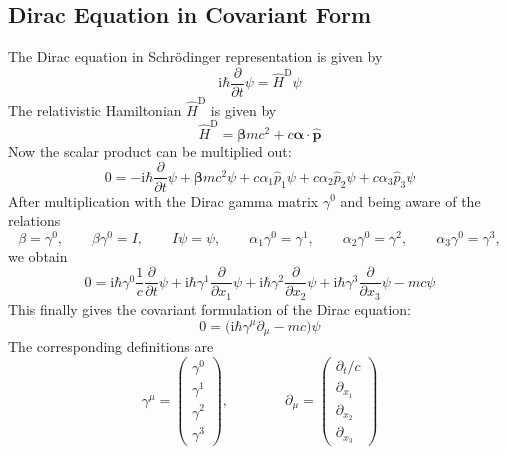 \documentclass[9pt]{report}
\begin{document}
\subsection{Dirac Equation in Covariant Form}
The Dirac equation in Schrödinger representation is given by
\begin{equation}
\mathrm{i}\hbar\frac{\partial}{\partial t}\psi = \hat{H}^{\mathrm{D}}\psi
\end{equation}
The relativistic Hamiltonian $\hat{H}^{\mathrm{D}}$ is given by
\begin{equation}
\hat{H}^{\mathrm{D}}=\boldsymbol{\beta}mc^2+c\boldsymbol{\alpha}\cdot\hat{\boldsymbol{p}}
\end{equation}
Now the scalar product can be multiplied out:
\begin{equation}
0=-\mathrm{i}\hbar\frac{\partial}{\partial t}\psi+\boldsymbol{\beta}mc^{2}\psi+c\alpha_{1}\hat{p}_{1}\psi +c\alpha_{2}\hat{p}_{2}\psi +c\alpha_{3}\hat{p}_{3}\psi
\end{equation}
After multiplication with the Dirac gamma matrix $\gamma^0$ and being aware of the relations
\begin{equation}
\beta=\gamma^0,\qquad\beta\gamma^0=I,\qquad I\psi=\psi,\qquad\alpha_{1}\gamma^{0}=\gamma^{1},\qquad\alpha_{2}\gamma^{0}=\gamma^{2},\qquad\alpha_{3}\gamma^{0}=\gamma^{3},
\end{equation}
we obtain
\begin{equation}
0 = \mathrm{i}\hbar\gamma^{0}\frac{1}{c}\frac{\partial}{\partial t}\psi +\mathrm{i}\hbar\gamma^{1}\frac{\partial}{\partial x_1}\psi +\mathrm{i}\hbar\gamma^{2}\frac{\partial}{\partial x_2}\psi +\mathrm{i}\hbar\gamma^{3}\frac{\partial}{\partial x_3}\psi -mc\psi
\end{equation}
This finally gives the covariant formulation of the Dirac equation:
\begin{equation}
0=\big(\mathrm{i}\hbar\gamma^{\mu}\partial_{\mu}-mc\big)\psi
\end{equation}
The corresponding definitions are
\begin{equation}
\gamma^{\mu}
=
\left(\begin{array}{c}  
\gamma^{0}
\\
\gamma^{1}
\\
\gamma^{2}
\\
\gamma^{3}
\end{array}\right),
\qquad\qquad
\partial_{\mu}
=
\left(\begin{array}{c}  
\partial_{t}/c
\\
\partial_{x_1}
\\
\partial_{x_2}
\\
\partial_{x_3}
\end{array}\right)
\end{equation}
\end{document}
